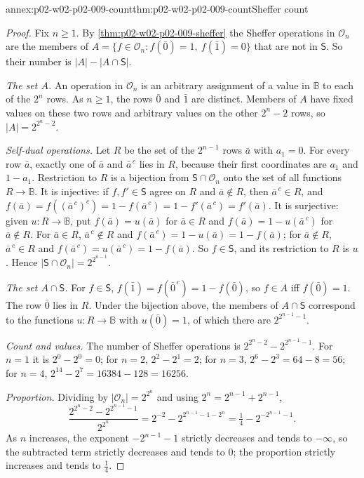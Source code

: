 \begin{annexitem}{annex:p02-w02-p02-009-count}{thm:p02-w02-p02-009-count}{Sheffer count}
\begin{proof}
Fix \(n\geq1\).  By \cref{thm:p02-w02-p02-009-sheffer} the Sheffer
operations in \(\mathcal O_n\) are the members of
\(A=\{f\in\mathcal O_n:f(\bar0)=1,\ f(\bar1)=0\}\) that are not in
\(\mathsf S\).  So their number is \(|A|-|A\cap\mathsf S|\).

\emph{The set \(A\).}  An operation in \(\mathcal O_n\) is an arbitrary
assignment of a value in \(\mathbb B\) to each of the \(2^n\) rows.  As
\(n\geq1\), the rows \(\bar0\) and \(\bar1\) are distinct.  Members of \(A\)
have fixed values on these two rows and arbitrary values on the other
\(2^n-2\) rows, so \(|A|=2^{2^n-2}\).

\emph{Self-dual operations.}  Let \(R\) be the set of the \(2^{n-1}\) rows
\(\bar a\) with \(a_1=0\).  For every row \(\bar a\), exactly one of
\(\bar a\) and \(\bar a^{\,c}\) lies in \(R\), because their first
coordinates are \(a_1\) and \(1-a_1\).  Restriction to \(R\) is a bijection
from \(\mathsf S\cap\mathcal O_n\) onto the set of all functions
\(R\to\mathbb B\).  It is injective: if \(f,f'\in\mathsf S\) agree on \(R\)
and \(\bar a\notin R\), then \(\bar a^{\,c}\in R\), and
\(f(\bar a)=f((\bar a^{\,c})^{c})=1-f(\bar a^{\,c})=1-f'(\bar a^{\,c})
=f'(\bar a)\).  It is surjective: given \(u:R\to\mathbb B\), put
\(f(\bar a)=u(\bar a)\) for \(\bar a\in R\) and
\(f(\bar a)=1-u(\bar a^{\,c})\) for \(\bar a\notin R\).  For
\(\bar a\in R\), \(\bar a^{\,c}\notin R\) and
\(f(\bar a^{\,c})=1-u(\bar a)=1-f(\bar a)\); for \(\bar a\notin R\),
\(\bar a^{\,c}\in R\) and \(f(\bar a^{\,c})=u(\bar a^{\,c})=1-f(\bar a)\).
So \(f\in\mathsf S\), and its restriction to \(R\) is \(u\).  Hence
\(|\mathsf S\cap\mathcal O_n|=2^{2^{n-1}}\).

\emph{The set \(A\cap\mathsf S\).}  For \(f\in\mathsf S\),
\(f(\bar1)=f(\bar0^{\,c})=1-f(\bar0)\), so \(f\in A\) iff \(f(\bar0)=1\).
The row \(\bar0\) lies in \(R\).  Under the bijection above, the members of
\(A\cap\mathsf S\) correspond to the functions \(u:R\to\mathbb B\) with
\(u(\bar0)=1\), of which there are \(2^{2^{n-1}-1}\).

\emph{Count and values.}  The number of Sheffer operations is
\(2^{2^n-2}-2^{2^{n-1}-1}\).  For \(n=1\) it is \(2^0-2^0=0\); for \(n=2\),
\(2^2-2^1=2\); for \(n=3\), \(2^6-2^3=64-8=56\); for \(n=4\),
\(2^{14}-2^7=16384-128=16256\).

\emph{Proportion.}  Dividing by \(|\mathcal O_n|=2^{2^n}\) and using
\(2^n=2^{n-1}+2^{n-1}\),
\[
 \frac{2^{2^n-2}-2^{2^{n-1}-1}}{2^{2^n}}
 =2^{-2}-2^{2^{n-1}-1-2^n}
 =\tfrac14-2^{-2^{n-1}-1}.
\]
As \(n\) increases, the exponent \(-2^{n-1}-1\) strictly decreases and tends
to \(-\infty\), so the subtracted term strictly decreases and tends to
\(0\); the proportion strictly increases and tends to \(\tfrac14\).
\end{proof}
\end{annexitem}


